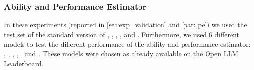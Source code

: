 \subsubsection{Ability and Performance Estimator} In these experiments (reported in \cref{sec:exp_validation} and \cref{par: pe}) we used the test set of the standard version of , , , , and . Furthermore, we used 6 different models to test the different performance of the ability and performance estimator: , , , , , and . These models were chosen as already available on the Open LLM Leaderboard.





